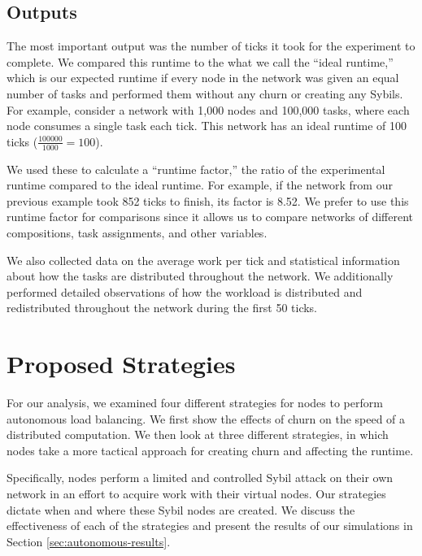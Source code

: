 \documentclass[10pt,conference]{IEEEtran}
\begin{document}
%

\subsection{Outputs}
The most important output was the number of ticks it took for the experiment to complete.
We compared this runtime to the what we call the ``ideal runtime,'' which is our expected runtime if every node in the network was given an equal number of tasks and performed them without any churn or creating any Sybils.
For example, consider a network with 1,000 nodes and 100,000 tasks, where each node consumes a single task each tick. 
This network has an ideal runtime of 100 ticks ($ \frac{100000}{1000} = 100$).

We used these to calculate a ``runtime factor,'' the ratio of the experimental runtime compared to the ideal runtime.
For example, if the network from our previous example took 852 ticks to finish, its factor is 8.52.
We prefer to use this runtime factor for comparisons since it allows us to compare networks of different compositions, task assignments, and other variables.

We also collected data on the average work per tick and statistical information about how the tasks are distributed throughout the network.
We additionally performed detailed observations of how the workload is  distributed and redistributed throughout the network during the first 50 ticks.

\section{Proposed Strategies}
\label{sec:strategies}

For our analysis, we examined four different strategies for nodes to perform autonomous load balancing.
We first show the effects of churn on the speed of a distributed computation.
We then look at three different strategies, in which nodes take a more tactical approach for creating churn and affecting the runtime.

Specifically, nodes perform a limited and controlled Sybil attack \cite{sybil} on their own network in an effort to acquire work with their virtual nodes.
Our strategies dictate when and where these Sybil nodes are created.
We discuss the effectiveness of each of the strategies and present the results of our simulations in Section \ref{sec:autonomous-results}.
\end{document}
